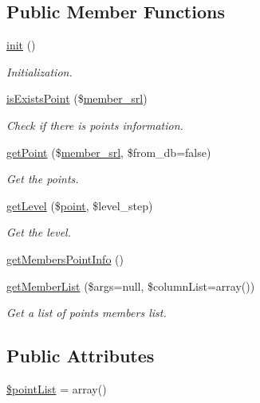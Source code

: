 \subsection*{Public Member Functions}
\begin{DoxyCompactItemize}
\item 
\hyperlink{classpointModel_add66679251115fa4592f15398f3efc62}{init} ()
\begin{DoxyCompactList}\small\item\em Initialization. \end{DoxyCompactList}\item 
\hyperlink{classpointModel_a9e143b8c0eb599eebcce662a70a1dbd9}{is\+Exists\+Point} (\$\hyperlink{ko_8install_8php_aa61f9e08f0fe505094d26f8143f30bbd}{member\+\_\+srl})
\begin{DoxyCompactList}\small\item\em Check if there is points information. \end{DoxyCompactList}\item 
\hyperlink{classpointModel_ac3d92531cca94dd31fde8f6b86a855fc}{get\+Point} (\$\hyperlink{ko_8install_8php_aa61f9e08f0fe505094d26f8143f30bbd}{member\+\_\+srl}, \$from\+\_\+db=false)
\begin{DoxyCompactList}\small\item\em Get the points. \end{DoxyCompactList}\item 
\hyperlink{classpointModel_aaada8e8cba6e965f06c2b25e4974537c}{get\+Level} (\$\hyperlink{classpoint}{point}, \$level\+\_\+step)
\begin{DoxyCompactList}\small\item\em Get the level. \end{DoxyCompactList}\item 
\hyperlink{classpointModel_a87117e204a484410442a54ee56332836}{get\+Members\+Point\+Info} ()
\item 
\hyperlink{classpointModel_ab3b968a740e10f9039da99adae67dcb7}{get\+Member\+List} (\$args=null, \$column\+List=array())
\begin{DoxyCompactList}\small\item\em Get a list of points members list. \end{DoxyCompactList}\end{DoxyCompactItemize}
\subsection*{Public Attributes}
\begin{DoxyCompactItemize}
\item 
\hyperlink{classpointModel_a4aec7fcf0df721c0046d2b9a9380f0ae}{\$point\+List} = array()
\end{DoxyCompactItemize}


